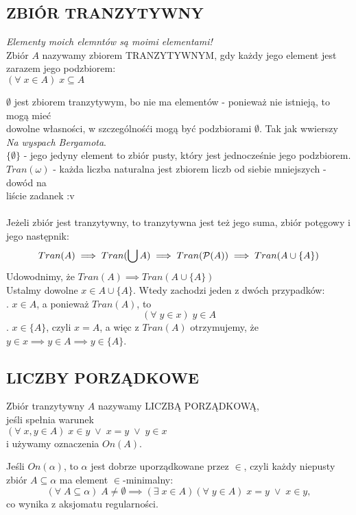 \subsection{ZBIÓR TRANZYTYWNY}
\begin{center}
    \emph{Elementy moich elemntów są moimi elementami!}\medskip\\
    Zbiór $A$ nazywamy zbiorem {\color{acc}TRANZYTYWNYM}, gdy każdy jego element jest zarazem jego podzbiorem:\smallskip\\
    $(\forall\;x\in A)\;x\subseteq A$
\end{center}
$\emptyset$ jest zbiorem tranzytywym, bo nie ma elementów - ponieważ nie istnieją, to mogą mieć \\dowolne własności, w szczególnośći mogą być podzbiorami $\emptyset$. Tak jak wwierszy \emph{Na wyspach Bergamota}.\medskip\\
$\{\emptyset\}$ - jego jedyny element to zbiór pusty, który jest jednocześnie jego podzbiorem.\medskip\\
$Tran(\omega)$ - każda liczba naturalna jest zbiorem liczb od siebie mniejszych - dowód na \\liście zadanek :v\bigskip\\
\bigskip\\
Jeżeli zbiór jest tranzytywny, to tranzytywna jest też jego {\color{def}suma, zbiór potęgowy i jego następnik:}
$$Tran(A)\implies Tran(\bigcup A)\implies Tran(\mathcal{P}(A))\implies Tran(A\cup \{A\})$$
\dowod
Udowodnimy, że $Tran(A)\implies Tran(A\cup \{A\})$\medskip\\
Ustalmy dowolne $x\in A\cup\{A\}$. Wtedy zachodzi jeden z dwóch przypadków:\medskip\\
. $x\in A$, a ponieważ $Tran(A)$, to
$$(\forall\;y\in x)\;y\in A$$
. $x\in\{A\}$, czyli $x=A$, a więc z $Tran(A)$ otrzymujemy, że $y\in x\implies y\in A\implies y\in \{A\}$.
\kondow
\subsection{LICZBY PORZĄDKOWE}
\begin{center}\large
    Zbiór tranzytywny $A$ nazywamy {\color{def}LICZBĄ PORZĄDKOWĄ}, \\jeśli spełnia warunek\smallskip\\
    $(\forall\;x,y\in A)\;x\in y\;\lor\;x=y\;\lor\; y\in x$\smallskip\\
    i używamy oznaczenia $On(A)$.
\end{center}
Jeśli $On(\alpha)$, to $\alpha$ jest dobrze uporządkowane przez $\in$, czyli każdy niepusty zbiór $A\subseteq \alpha$ ma element $\in$-minimalny:
$$(\forall\;A\subseteq \alpha)\;A\neq\emptyset\implies(\exists\;x\in A)(\forall\;y\in A)\;x=y\;\lor\;x\in y,$$
co wynika z aksjomatu regularności.\bigskip\\
\bigskip\\

